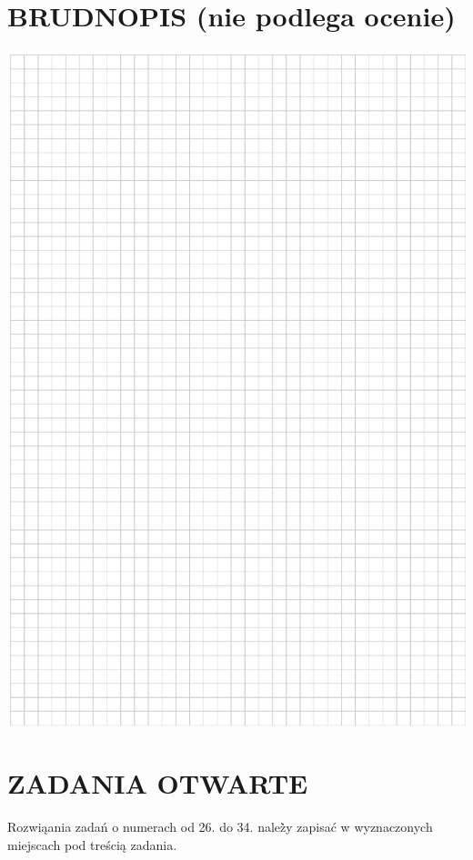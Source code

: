\documentclass[10pt]{article}
\begin{document}
\section*{BRUDNOPIS (nie podlega ocenie)}
\begin{center}
\includegraphics[max width=\textwidth]{2024_11_21_779b7f825da3a12753feg-11}
\end{center}

\section*{ZADANIA OTWARTE}
Rozwiąania zadań o numerach od 26. do 34. należ̀y zapisać w wyznaczonych miejscach pod treścią zadania.
\end{document}

